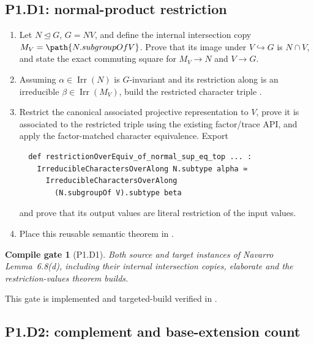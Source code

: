 \documentclass[11pt]{article}
\newtheorem{gate}{Compile gate}
\newcommand{\Irr}{\operatorname{Irr}}
\begin{document}
\subsection{P1.D1: normal-product restriction}

\begin{enumerate}[label=\textbf{P1.D1.\arabic*.},leftmargin=*]
  \item Let \(N\trianglelefteq G\), \(G=NV\), and define the internal
  intersection copy \(M_V=\path{N.subgroupOf V}\).  Prove that its image
  under \(V\hookrightarrow G\) is \(N\cap V\), and state the exact
  commuting square for \(M_V\to N\) and \(V\to G\).
  \item Assuming \(\alpha\in\Irr(N)\) is \(G\)-invariant and its
  restriction along  is an
  irreducible \(\beta\in\Irr(M_V)\), build the restricted character triple
  .
  \item Restrict the canonical associated projective representation to
  \(V\), prove it is associated to the restricted triple using the existing
  factor/trace API, and apply the factor-matched character equivalence.
  Export
  \begin{lstlisting}
  def restrictionOverEquiv_of_normal_sup_eq_top ... :
    IrreducibleCharactersOverAlong N.subtype alpha ≃
      IrreducibleCharactersOverAlong
        (N.subgroupOf V).subtype beta
  \end{lstlisting}
  and prove that its output values are literal restriction of the input
  values.
  \item Place this reusable semantic theorem in
  .
\end{enumerate}

\begin{gate}[P1.D1]
Both source and target instances of Navarro Lemma~6.8(d), including their
internal intersection copies, elaborate and the restriction-values theorem
builds.
\end{gate}

This gate is implemented and targeted-build verified in
.

\subsection{P1.D2: complement and base-extension count}
\end{document}
